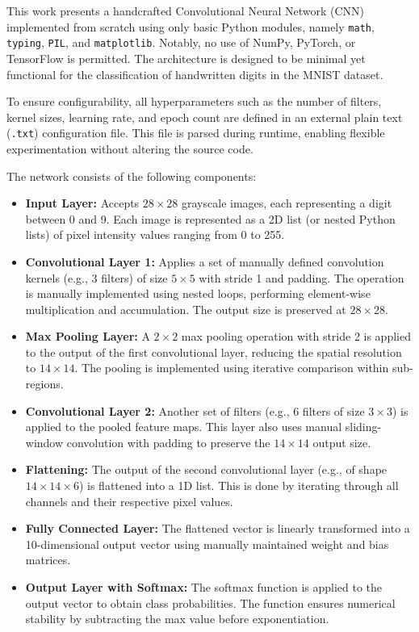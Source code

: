 \documentclass[conference]{IEEEtran}
\begin{document}
This work presents a handcrafted Convolutional Neural Network (CNN) implemented from scratch using only basic Python modules, namely \texttt{math}, \texttt{typing}, \texttt{PIL}, and \texttt{matplotlib}. Notably, no use of NumPy, PyTorch, or TensorFlow is permitted. The architecture is designed to be minimal yet functional for the classification of handwritten digits in the MNIST dataset. 

To ensure configurability, all hyperparameters such as the number of filters, kernel sizes, learning rate, and epoch count are defined in an external plain text (\texttt{.txt}) configuration file. This file is parsed during runtime, enabling flexible experimentation without altering the source code.

The network consists of the following components:

\begin{itemize}
    \item \textbf{Input Layer:} Accepts $28 \times 28$ grayscale images, each representing a digit between 0 and 9. Each image is represented as a 2D list (or nested Python lists) of pixel intensity values ranging from 0 to 255.

    \item \textbf{Convolutional Layer 1:} Applies a set of manually defined convolution kernels (e.g., 3 filters) of size $5 \times 5$ with stride 1 and padding. The operation is manually implemented using nested loops, performing element-wise multiplication and accumulation. The output size is preserved at $28 \times 28$.

    \item \textbf{Max Pooling Layer:} A $2 \times 2$ max pooling operation with stride 2 is applied to the output of the first convolutional layer, reducing the spatial resolution to $14 \times 14$. The pooling is implemented using iterative comparison within sub-regions.

    \item \textbf{Convolutional Layer 2:} Another set of filters (e.g., 6 filters of size $3 \times 3$) is applied to the pooled feature maps. This layer also uses manual sliding-window convolution with padding to preserve the $14 \times 14$ output size.

    \item \textbf{Flattening:} The output of the second convolutional layer (e.g., of shape $14 \times 14 \times 6$) is flattened into a 1D list. This is done by iterating through all channels and their respective pixel values.

    \item \textbf{Fully Connected Layer:} The flattened vector is linearly transformed into a 10-dimensional output vector using manually maintained weight and bias matrices.

    \item \textbf{Output Layer with Softmax:} The softmax function is applied to the output vector to obtain class probabilities. The function ensures numerical stability by subtracting the max value before exponentiation.
\end{itemize}
\end{document}

